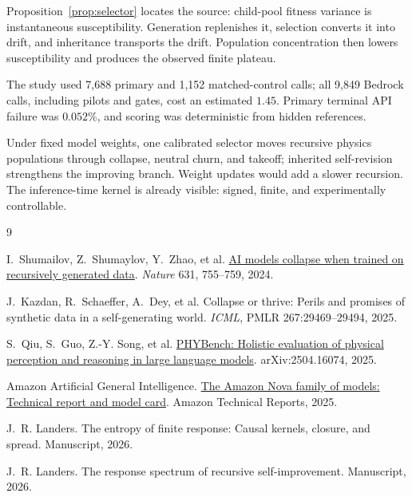 \documentclass[10pt]{article}
\begin{document}
Proposition~\ref{prop:selector} locates the source: child-pool fitness variance is instantaneous susceptibility. Generation replenishes it, selection converts it into drift, and inheritance transports the drift. Population concentration then lowers susceptibility and produces the observed finite plateau.

The study used 7,688 primary and 1,152 matched-control calls; all 9,849 Bedrock calls, including pilots and gates, cost an estimated $1.45$. Primary terminal API failure was $0.052\%$, and scoring was deterministic from hidden references.

Under fixed model weights, one calibrated selector moves recursive physics populations through collapse, neutral churn, and takeoff; inherited self-revision strengthens the improving branch. Weight updates would add a slower recursion. The inference-time kernel is already visible: signed, finite, and experimentally controllable.

\vspace{-0.5em}
\begin{thebibliography}{9}\fontsize{10}{10.8}\selectfont
\setlength{\parskip}{0pt}
\setlength{\itemsep}{-0.10em}
\setlength{\parsep}{0pt}

I.~Shumailov, Z.~Shumaylov, Y.~Zhao, et al.
\newblock \href{https://doi.org/10.1038/s41586-024-07566-y}{AI models collapse when trained on recursively generated data}.
\newblock \emph{Nature} 631, 755--759, 2024.

J.~Kazdan, R.~Schaeffer, A.~Dey, et al.
\newblock Collapse or thrive: Perils and promises of synthetic data in a self-generating world.
\newblock \emph{ICML}, PMLR 267:29469--29494, 2025.

S.~Qiu, S.~Guo, Z.-Y. Song, et al.
\newblock \href{https://arxiv.org/abs/2504.16074}{PHYBench: Holistic evaluation of physical perception and reasoning in large language models}.
\newblock arXiv:2504.16074, 2025.

Amazon Artificial General Intelligence.
\newblock \href{https://arxiv.org/abs/2506.12103}{The Amazon Nova family of models: Technical report and model card}.
\newblock Amazon Technical Reports, 2025.

J.~R. Landers.
\newblock The entropy of finite response: Causal kernels, closure, and spread.
\newblock Manuscript, 2026.

J.~R. Landers.
\newblock The response spectrum of recursive self-improvement.
\newblock Manuscript, 2026.

\end{thebibliography}
\end{document}
